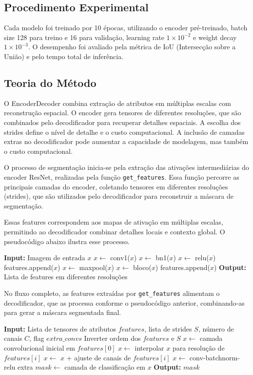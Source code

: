 \documentclass[%
 reprint,
 amsmath,amssymb,
 aps,
]{revtex4-2}
\begin{document}
\subsection{Procedimento Experimental}
Cada modelo foi treinado por 10 épocas, utilizando o encoder pré-treinado, batch size 128 para treino e 16 para validação, learning rate $1\times10^{-2}$ e weight decay $1\times10^{-3}$. O desempenho foi avaliado pela métrica de IoU (Intersecção sobre a União) e pelo tempo total de inferência.

\subsection{Teoria do Método}

O EncoderDecoder combina extração de atributos em múltiplas escalas com reconstrução espacial. O encoder gera tensores de diferentes resoluções, que são combinados pelo decodificador para recuperar detalhes espaciais. A escolha dos strides define o nível de detalhe e o custo computacional. A inclusão de camadas extras no decodificador pode aumentar a capacidade de modelagem, mas também o custo computacional.

O processo de segmentação inicia-se pela extração das ativações intermediárias do encoder ResNet, realizadas pela função \texttt{get\_features}. Essa função percorre as principais camadas do encoder, coletando tensores em diferentes resoluções (strides), que são utilizados pelo decodificador para reconstruir a máscara de segmentação.

Essas features correspondem aos mapas de ativação em múltiplas escalas, permitindo ao decodificador combinar detalhes locais e contexto global. O pseudocódigo abaixo ilustra esse processo.

\begin{algorithmic}[1]
\State \textbf{Input:} Imagem de entrada $x$
\State $x \gets$ conv1($x$)
\State $x \gets$ bn1($x$)
\State $x \gets$ relu($x$)
\State features.append($x$)
\State $x \gets$ maxpool($x$)
    \State $x \gets$ bloco($x$)
    \State features.append($x$)
\EndFor
\State \textbf{Output:} Lista de features em diferentes resoluções
\end{algorithmic}

No fluxo completo, as features extraídas por \texttt{get\_features} alimentam o decodificador, que as processa conforme o pseudocódigo anterior, combinando-as para gerar a máscara segmentada final.

\begin{algorithmic}[1]
\State \textbf{Input:} Lista de tensores de atributos $features$, lista de strides $S$, número de canais $C$, flag $extra\_convs$
\State Inverter ordem dos $features$ e $S$
\State $x \gets$ camada convolucional inicial em $features[0]$
    \State $x \gets$ interpolar $x$ para resolução de $features[i]$
    \State $x \gets$ $x$ + ajuste de canais de $features[i]$
        \State $x \gets$ conv-batchnorm-relu extra
    \EndIf
\EndFor
\State $mask \gets$ camada de classificação em $x$
\State \textbf{Output:} $mask$
\end{algorithmic}
\end{document}
